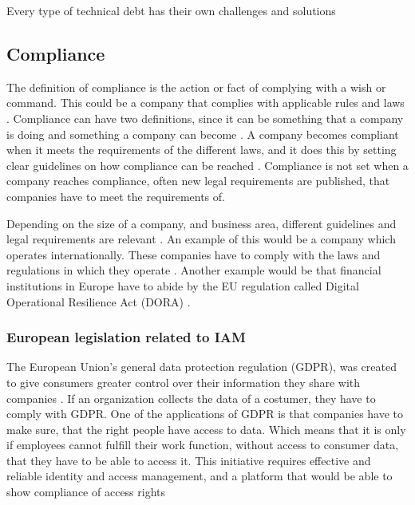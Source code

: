 Every type of technical debt has their own challenges and solutions\citep{TechinicalDebtOUTsystem}
\subsection{Compliance}
The definition of compliance is the action or fact of complying with a wish or command. This could be a company that complies with applicable rules and laws \citep{2024compliance?}. Compliance can have two definitions, since it can be something that a company is doing and something a company can become \citep{legaldeskcompliance}. A company becomes compliant when it meets the requirements of the different laws, and it does this by setting clear guidelines on how compliance can be reached \citep{legaldeskcompliance}. Compliance is not set when a company reaches compliance, often new legal requirements are published, that companies have to meet the requirements of.

Depending on the size of a company, and business area, different guidelines and legal requirements are relevant \cite{2024compliance?}. An example of this would be a company which operates internationally. These companies have to comply with the laws and regulations in which they operate \citep{2024compliance?}. Another example would be that financial institutions in Europe have to abide by the EU regulation called Digital Operational Resilience Act (DORA) \citep{Dora}.


\subsubsection{European legislation related to IAM}
The European Union's general data protection regulation (GDPR), was created to give consumers greater control over their information they share with companies \citep{IAM-gdpr:}. If an organization collects the data of a costumer, they have to comply with GDPR. One of the applications of GDPR is that companies have to make sure, that the right people have access to data. Which means that it is only if employees cannot fulfill their work function, without access to consumer data, that they have to be able to access it. This initiative requires effective and reliable identity and access management, and a platform that would be able to show compliance of access rights \citep{IAM-gdpr:}

